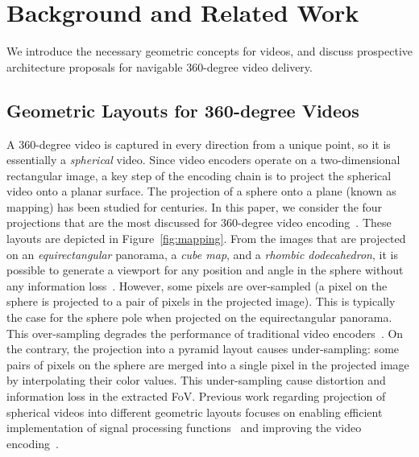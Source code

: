 \section{Background and Related Work}
\label{sec:related}

We introduce the necessary geometric concepts for 
videos, and discuss prospective architecture
proposals for navigable 360-degree video delivery.

\subsection{Geometric Layouts for 360-degree Videos}

A 360-degree video is captured in every direction from a unique point,
so it is essentially a \emph{spherical} video. Since video encoders
operate on a two-dimensional rectangular image, a key step of the
encoding chain is to project the spherical video onto a planar
surface. The projection of a sphere onto a plane (known as mapping)
has been studied for centuries. In this paper, we consider the four
projections that are the most discussed for 360-degree video
encoding~\cite{yu_framework_2015}. These layouts are depicted in
Figure~\ref{fig:mapping}.
From the images that are projected on an \textit{equirectangular}
panorama, a \textit{cube map}, and a \textit{rhombic dodecahedron}, it
is possible to generate a viewport for any position and angle in the
sphere without any information loss~\cite{Ng2005, fu_rhombic_2009}.
However, some pixels are over-sampled (a pixel on the sphere is
projected to a pair of pixels in the projected image). This is
typically the case for the sphere pole when projected on the
equirectangular panorama. This over-sampling degrades the performance
of traditional video encoders~\cite{wojciechowski_h.264_2006,
yu_framework_2015}. On the contrary, the projection into a pyramid
layout causes under-sampling: some pairs of pixels on the sphere
are merged into a
single pixel in the projected image by interpolating their color
values. This under-sampling cause distortion and information loss in
the extracted FoV. Previous work regarding projection of spherical
videos into different geometric layouts focuses on enabling efficient
implementation of signal processing
functions~\cite{kazhdan_metric-aware_2010} and improving the video
encoding~\cite{tosic_low_2009}.

